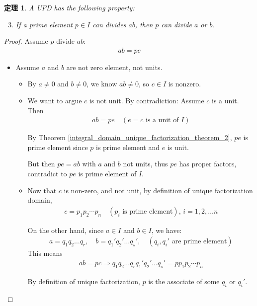 \documentclass[utf8]{ctexbook}
\newtheorem{theorem}{定理}[section]
\begin{document}
\begin{theorem}
A UFD has the following property:
\begin{enumerate}
\setcounter{enumi}{2}
\item{If a prime element $p \in I$ can divides $ab$, then $p$ can divide $a$ or $b$.}
\end{enumerate}
\end{theorem}

\begin{proof}
Assume $p$ divide $ab$:
\begin{align*}
ab = p c
\end{align*}

\begin{itemize}
\item{Assume $a$ and $b$ are not zero element, not units.}
\begin{itemize}
\item{By $a \neq 0$ and $b \neq 0$, we know $ab \neq 0$, so $c \in I$ is nonzero.}
\item{We want to argue $c$ is not unit. By contradiction: Assume $c$ is a unit. Then 
\begin{align*}
ab = p e \quad (e = c \mbox{  is a unit of } I)
\end{align*}

By Theorem \ref{integral_domain_unique_factorization_theorem_2}, $pe$ is prime element since $p$ is prime element and $e$ is unit.

But then $pe = ab$ with $a$ and $b$ not units, thus $pe$ has proper factors, contradict to $pe$ is prime element of $I$.
}
\item{Now that $c$ is non-zero, and not unit, by definition of unique factorization domain,
\begin{align*}
c = p_1 p_2 \cdots p_n \quad (p_i \mbox{ is prime element}), \, i = 1, 2, \ldots n
\end{align*}

On the other hand, since $a \in I$ and $b \in I$, we have:
\begin{align*}
a = q_1 q_2 \ldots q_r, \quad b = q_1 ' q_2 ' \ldots q_s ', \quad (q_i, q_i ' \mbox{ are prime element})
\end{align*}
This means
\begin{align*}
ab = pc \Longrightarrow q_1 q_2 \ldots q_r q_1 ' q_2 ' \ldots q_s ' = p p_1 p_2 \cdots p_n 
\end{align*}

By definition of unique factorization, $p$ is the associate of some $q_i$ or $q_i '$.

}
\end{itemize}
\end{itemize}
\end{proof}
\end{document}
